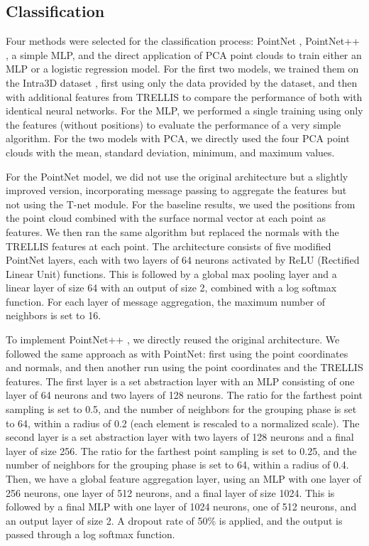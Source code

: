 \documentclass[%
 reprint,
 amsmath,amssymb,
 aps,
 floatfix,
 nofootinbib,
]{revtex4-2}
\begin{document}
\subsection{Classification}

Four methods were selected for the classification process: PointNet \citep{pointnet}, PointNet++ \citep{pointnetpp}, a simple MLP, and the direct application of PCA point clouds to train either an MLP or a logistic regression model. For the first two models, we trained them on the Intra3D dataset \citep{yang2020intra}, first using only the data provided by the dataset, and then with additional features from TRELLIS \citep{xiang2024structured} to compare the performance of both with identical neural networks. For the MLP, we performed a single training using only the features (without positions) to evaluate the performance of a very simple algorithm. For the two models with PCA, we directly used the four PCA point clouds with the mean, standard deviation, minimum, and maximum values.

For the PointNet \citep{pointnet} model, we did not use the original architecture but a slightly improved version, incorporating message passing to aggregate the features but not using the T-net module. For the baseline results, we used the positions from the point cloud combined with the surface normal vector at each point as features. We then ran the same algorithm but replaced the normals with the TRELLIS \citep{xiang2024structured} features at each point. The architecture consists of five modified PointNet layers, each with two layers of 64 neurons activated by ReLU (Rectified Linear Unit) functions. This is followed by a global max pooling layer and a linear layer of size 64 with an output of size 2, combined with a log softmax function. For each layer of message aggregation, the maximum number of neighbors is set to 16.

To implement PointNet++ \citep{pointnetpp}, we directly reused the original architecture. We followed the same approach as with PointNet: first using the point coordinates and normals, and then another run using the point coordinates and the TRELLIS \citep{xiang2024structured} features. The first layer is a set abstraction layer with an MLP consisting of one layer of 64 neurons and two layers of 128 neurons. The ratio for the farthest point sampling is set to 0.5, and the number of neighbors for the grouping phase is set to 64, within a radius of 0.2 (each element is rescaled to a normalized scale). The second layer is a set abstraction layer with two layers of 128 neurons and a final layer of size 256. The ratio for the farthest point sampling is set to 0.25, and the number of neighbors for the grouping phase is set to 64, within a radius of 0.4. Then, we have a global feature aggregation layer, using an MLP with one layer of 256 neurons, one layer of 512 neurons, and a final layer of size 1024. This is followed by a final MLP with one layer of 1024 neurons, one of 512 neurons, and an output layer of size 2. A dropout rate of 50\% is applied, and the output is passed through a log softmax function.
\end{document}
